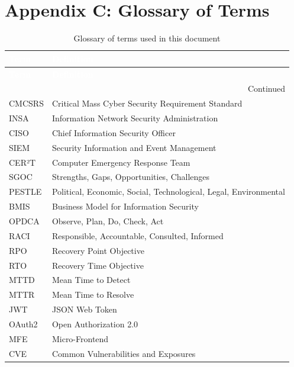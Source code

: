 \section{Appendix C: Glossary of Terms}

\begin{center}
\begin{longtable}{|p{}|p{}|}
\caption[Glossary]{Glossary of terms used in this document}
\label{tab:glossary} \\
\hline
\rowcolor{mooveblue}
\textcolor{white}{\textbf{Term}} & \textcolor{white}{\textbf{Definition}} \\
\hline
\endfirsthead
\hline
\rowcolor{mooveblue}
\textcolor{white}{\textbf{Term}} & \textcolor{white}{\textbf{Definition}} \\
\hline
\endhead
\hline
\multicolumn{2}{|r|}{Continued} \\
\hline
\endfoot
\hline
\endlastfoot
CMCSRS & Critical Mass Cyber Security Requirement Standard \\
INSA & Information Network Security Administration \\
CISO & Chief Information Security Officer \\
SIEM & Security Information and Event Management \\
CER²T & Computer Emergency Response Team \\
SGOC & Strengths, Gaps, Opportunities, Challenges \\
PESTLE & Political, Economic, Social, Technological, Legal, Environmental \\
BMIS & Business Model for Information Security \\
OPDCA & Observe, Plan, Do, Check, Act \\
RACI & Responsible, Accountable, Consulted, Informed \\
RPO & Recovery Point Objective \\
RTO & Recovery Time Objective \\
MTTD & Mean Time to Detect \\
MTTR & Mean Time to Resolve \\
JWT & JSON Web Token \\
OAuth2 & Open Authorization 2.0 \\
MFE & Micro-Frontend \\
CVE & Common Vulnerabilities and Exposures \\
\hline
\end{longtable}
\end{center}

